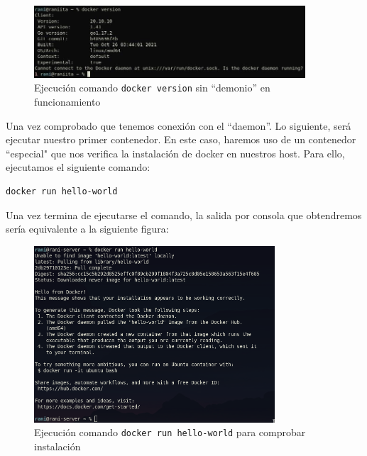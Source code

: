 \documentclass[12pt]{article}
\begin{document}
	\begin{figure}[h]
		\begin{center}
			\includegraphics[width=0.9\textwidth]{img/docker_version.jpg}
			\caption{Ejecución comando \texttt{docker version} sin ``demonio'' en funcionamiento}
			\label{img: docker version}
		\end{center}
	\end{figure}

	\pagebreak
	
	\noindent Una vez comprobado que tenemos conexión con el ``daemon''. Lo siguiente, será ejecutar nuestro primer contenedor. En este caso, haremos uso de un contenedor ``especial" que nos verifica la instalación de docker en nuestros host. Para ello, ejecutamos el siguiente comando:
	\begin{verbatim}
docker run hello-world
	\end{verbatim}

	\noindent Una vez termina de ejecutarse el comando, la salida por consola que obtendremos sería equivalente a la siguiente figura:
	
	\begin{figure}[h]
		\begin{center}
			\includegraphics[width=0.8\textwidth]{img/docker_hello-world.png}
			\caption{Ejecución comando \texttt{docker run hello-world} para comprobar instalación}
			\label{img: docker hello world}
		\end{center}
	\end{figure}
\end{document}
